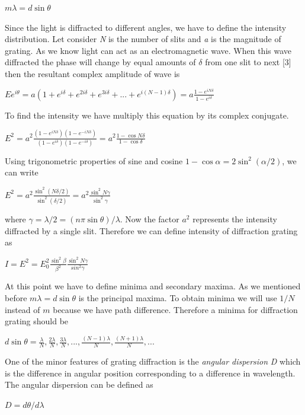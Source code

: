 \documentclass[a4paper,12pt]{report}
\begin{document}
\begin{center}
	$m\lambda=d\sin\theta$
\end{center}
Since the light is diffracted to different angles, we have to define the intensity distribution. Let consider \textit{N} is the number of slits and \textit{a} is the magnitude of grating. As we know light can act as an electromagnetic wave. When this wave diffracted the phase will change by equal amounts of $\delta$ from one slit to next [3] then the resultant complex amplitude of wave is 
\begin{center}
	$Ee^{i\theta}=a(1+e^{i\delta}+e^{2i\delta}+e^{3i\delta}+...+e^{i(N-1)\delta})=a\frac{1-e^{iN\delta}}{1-e^{i\delta}}$ 
\end{center}
To find the intensity we have multiply this equation by its complex conjugate.
\begin{center}
	$E^{2}=a^{2}\frac{(1-e^{iN\delta})(1-e^{-iN\delta})}{(1-e^{i\delta})(1-e^{-i\delta})}=a^{2}\frac{1-\cos N\delta}{1-\cos \delta}$
\end{center}
Using trigonometric properties of sine and cosine $1-\cos\alpha=2\sin^{2}(\alpha/2)$, we can write
\begin{center}
	$E^{2}=a^{2}\frac{\sin^{2}(N\delta/2)}{\sin^{2}(\delta/2)}=a^{2}\frac{\sin^{2}N\gamma}{\sin^{2}\gamma}$
\end{center}
where $\gamma=\lambda/2=(n\pi\sin\theta)/\lambda$. Now the factor $a^{2}$ represents the intensity diffracted by a single slit. Therefore we can define intensity of diffraction grating as
\begin{center}
	$I=E^{2}=E_{0}^{2}\frac{\sin^{2}\beta}{\beta^{2}}\frac{\sin^{2}N\gamma}{sin^{2}\gamma}$
\end{center}
At this point we have to define minima and secondary maxima. As we mentioned before $m\lambda=d\sin\theta$ is the principal maxima. To obtain minima we will use $1/N$ instead of $m$ because we have path difference. Therefore a minima for diffraction grating should be 
\begin{center}
	$d\sin\theta=\frac{\lambda}{N}, \frac{2\lambda}{N}, \frac{3\lambda}{N},...,\frac{(N-1)\lambda}{N}, \frac{(N+1)\lambda}{N},...$
\end{center}
One of the minor features of grating diffraction is the \textit{angular dispersion} \textit{D} which is the difference in angular position corresponding to a difference in wavelength. The angular dispersion can be defined as 
\begin{center}
	$D=d\theta/d\lambda$ 
\end{center}
\end{document}
